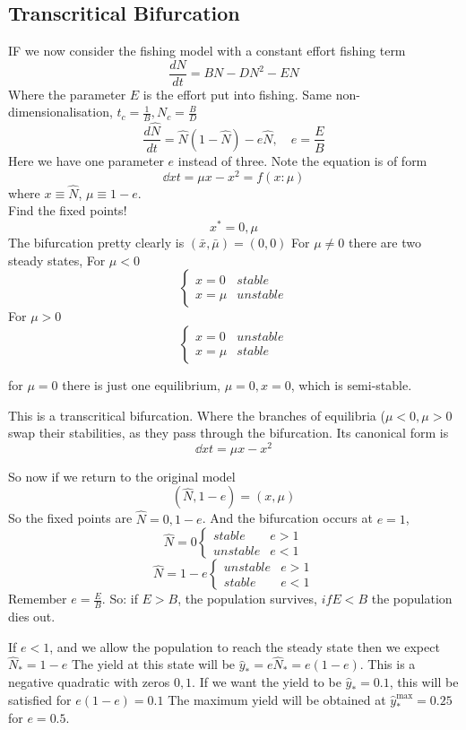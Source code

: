 \documentclass{/home/janmebows/Documents/LatexTemplates/myassignment}
\begin{document}
\subsection{Transcritical Bifurcation}
IF we now consider the fishing model with a constant effort fishing term
\[\frac{dN}{dt} = BN - DN^2 - EN\]
Where the parameter $E$ is the effort put into fishing.
Same non-dimensionalisation, $t_c = \frac1B, N_c =\frac{B}{D}$
\[\frac{d\hat{N}}{dt} = \hat{N} (1-\hat{N}) - e\hat{N}, \quad e=\frac{E}{B}\]
Here we have one parameter $e$ instead of three.
Note the equation is of form
\[\dd xt = \mu x - x^2 = f(x:\mu)\]
where $x\equiv \hat{N}$, $\mu\equiv 1-e$.\\
Find the fixed points!
\[x^* = 0, \mu\]
The bifurcation pretty clearly is $(\bar{x},\bar{\mu}) = (0,0)$
For $\mu \neq 0$ there are two steady states, For $\mu < 0$
\[\begin{cases}x=0 &stable\\ x=\mu &unstable\end{cases}\]
For $\mu > 0$
\[\begin{cases}x=0 &unstable\\ x=\mu &stable\end{cases}\]

for $\mu=0$ there is just one equilibrium, $\mu =0, x=0$, which is semi-stable.

This is a transcritical bifurcation. Where the branches of equilibria ($\mu <0,\mu >0$ swap their stabilities, as they pass through the bifurcation. Its canonical form is
\[\dd xt = \mu x - x^2\]


So now if we return to the original model
\[(\hat{N},1-e) = (x,\mu)\]
So the fixed points are $\hat{N} = 0, 1-e$. And the bifurcation occurs at $e=1$, 
\[\hat{N} = 0 \begin{cases} stable & e>1 \\ unstable & e<1\end{cases}\]
\[\hat{N} = 1-e \begin{cases}unstable & e>1\\ stable & e<1\end{cases}\]
Remember $e = \frac{E}{B}$. So: if $E > B$, the population survives, $if E <B$ the population dies out.

If $e <1$, and we allow the population to reach the steady state then we expect $\hat{N}_* = 1-e$
The yield at this state will be $\hat{y}_* = e\hat{N}_* = e(1-e)$. This is a negative quadratic with zeros $0,1$. If we want the yield to be $\hat{y}_* = 0.1$, this will be satisfied for $e(1-e) = 0.1$
The maximum yield will be obtained at $\hat{y}_*^{\max} = 0.25$ for $e=0.5$.
\end{document}
